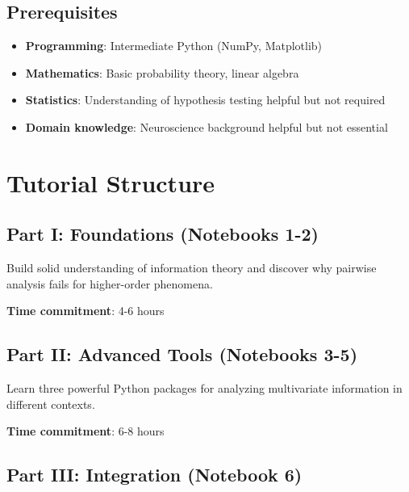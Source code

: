 \documentclass[
  11pt,
  letterpaper,
  oneside,
  openany]{book}
\providecommand{\tightlist}{%
  \setlength{\itemsep}{0pt}\setlength{\parskip}{0pt}}
\begin{document}
\subsection*{Prerequisites}\label{prerequisites}

\begin{itemize}
\tightlist
\item
  \textbf{Programming}: Intermediate Python (NumPy, Matplotlib)
\item
  \textbf{Mathematics}: Basic probability theory, linear algebra
\item
  \textbf{Statistics}: Understanding of hypothesis testing helpful but
  not required
\item
  \textbf{Domain knowledge}: Neuroscience background helpful but not
  essential
\end{itemize}

\section*{Tutorial Structure}\label{tutorial-structure}


\subsection*{Part I: Foundations (Notebooks
1-2)}\label{part-i-foundations-notebooks-1-2}

Build solid understanding of information theory and discover why
pairwise analysis fails for higher-order phenomena.

\textbf{Time commitment}: 4-6 hours

\subsection*{Part II: Advanced Tools (Notebooks
3-5)}\label{part-ii-advanced-tools-notebooks-3-5}

Learn three powerful Python packages for analyzing multivariate
information in different contexts.

\textbf{Time commitment}: 6-8 hours

\subsection*{Part III: Integration (Notebook
6)}\label{part-iii-integration-notebook-6}
\end{document}
